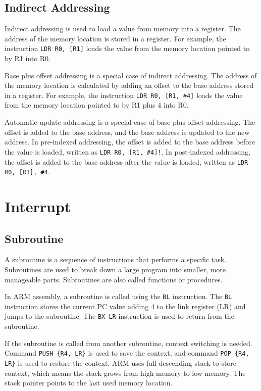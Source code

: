 \documentclass[a4paper,12pt]{article}
\begin{document}
\subsection{Indirect Addressing}

Indirect addressing is used to load a value from memory into a register. The address of the memory location is stored in a register. For example, the instruction \texttt{LDR R0, [R1]} loads the value from the memory location pointed to by R1 into R0.

Base plus offset addressing is a special case of indirect addressing. The address of the memory location is calculated by adding an offset to the base address stored in a register. For example, the instruction \texttt{LDR R0, [R1, \#4]} loads the value from the memory location pointed to by R1 plus 4 into R0.

Automatic update addressing is a special case of base plus offset addressing. The offset is added to the base address, and the base address is updated to the new address. In pre-indexed addressing, the offset is added to the base address before the value is loaded, written as \texttt{LDR R0, [R1, \#4]!}. In post-indexed addressing, the offset is added to the base address after the value is loaded, written as \texttt{LDR R0, [R1], \#4}.

\section{Interrupt}

\subsection{Subroutine}

A subroutine is a sequence of instructions that performs a specific task. Subroutines are used to break down a large program into smaller, more manageable parts. Subroutines are also called functions or procedures.

In ARM assembly, a subroutine is called using the \texttt{BL} instruction. The \texttt{BL} instruction stores the current PC value adding 4 to the link register (LR) and jumps to the subroutine. The \texttt{BX LR} instruction is used to return from the subroutine.

If the subroutine is called from another subroutine, context switching is needed. Command \texttt{PUSH \{R4, LR\}} is used to save the context, and command \texttt{POP \{R4, LR\}} is used to restore the context. ARM uses full descending stack to store context, which means the stack grows from high memory to low memory. The stack pointer points to the last used memory location.
\end{document}
